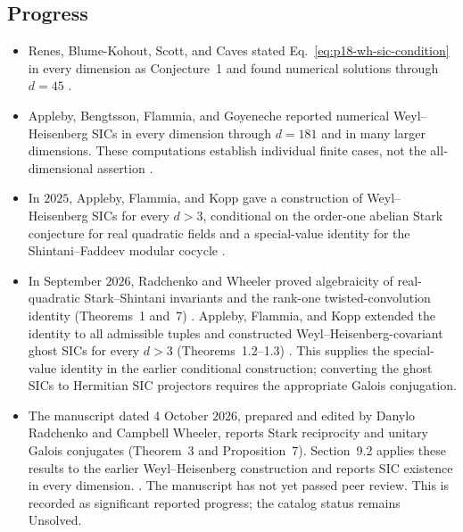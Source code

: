 \subsection*{Progress}

\begin{itemize}
  \item Renes, Blume-Kohout, Scott, and Caves stated
  Eq.~\eqref{eq:p18-wh-sic-condition} in every dimension as Conjecture~1 and
  found numerical solutions through $d=45$
  .

  \item Appleby, Bengtsson, Flammia, and Goyeneche reported numerical
  Weyl--Heisenberg SICs in every dimension through $d=181$ and in many larger
  dimensions.  These computations establish individual finite cases, not the
  all-dimensional assertion
  .

  \item In $2025$, Appleby, Flammia, and Kopp gave a construction of
  Weyl--Heisenberg SICs for every $d>3$, conditional on the order-one abelian
  Stark conjecture for real quadratic fields and a special-value identity
  for the Shintani--Faddeev modular cocycle
  .

  \item In September $2026$, Radchenko and Wheeler proved algebraicity of
  real-quadratic Stark--Shintani invariants and the rank-one
  twisted-convolution identity (Theorems~1 and~7)
  .
  Appleby, Flammia, and Kopp extended the identity to all admissible tuples
  and constructed Weyl--Heisenberg-covariant ghost SICs for every $d>3$
  (Theorems~1.2--1.3) .
  This supplies the special-value identity in the earlier conditional
  construction; converting the ghost SICs to Hermitian SIC projectors
  requires the appropriate Galois conjugation.

  \item The manuscript dated 4 October $2026$, prepared and edited by Danylo
  Radchenko and Campbell Wheeler, reports Stark reciprocity and unitary
  Galois conjugates (Theorem~3 and Proposition~7). Section~9.2 applies these results to the earlier Weyl--Heisenberg
  construction and reports SIC existence in every dimension.
  .
  The manuscript has not yet passed peer review. This is recorded as
  significant reported progress; the catalog status remains Unsolved.
\end{itemize}

